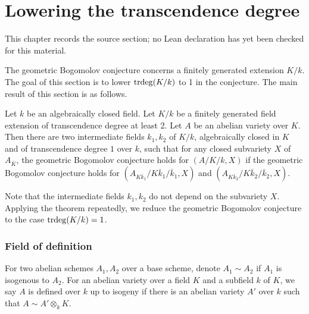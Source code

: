 \chapter{Lowering the transcendence degree}
\label{geometric-bogomolov-conjecture-arbitrary-characteristics-chapter-03}

\begin{remark}
\label{geometric-bogomolov-conjecture-arbitrary-characteristics-chapter-03-source}
This chapter records the source section; no Lean declaration has yet been checked for this material.
\notready
\end{remark}

\label{sec trdeg}

The geometric Bogomolov conjecture concerns a finitely generated extension $K/k$.
The goal of this section is to lower ${\mathrm{trdeg}}(K/k)$ to 1 in the conjecture.
The main result of this section is as follows.

\begin{pro}\label{changefield}
Let $k$ be an algebraically closed field.
Let $K/k$ be a finitely generated field extension of transcendence degree at least 2.
Let $A$ be an abelian variety over $K$.
Then there are two intermediate fields $k_1,k_2$ of $K/k$, algebraically closed in $K$ and of transcendence degree $1$ over $k$, such that for any closed subvariety $X$ of $A_{\overline{K}}$,  the geometric Bogomolov conjecture holds for $(A/K/k, X)$ if the geometric Bogomolov conjecture holds for $(A_{K\overline k_1}/K\overline k_1/\overline k_1,X)$ and $(A_{K\overline k_2}/K\overline k_2/\overline k_2,X)$.
\end{pro}

Note that the intermediate fields $k_1,k_2$ do not depend on the subvariety $X$.
Applying the theorem repeatedly, we reduce the geometric Bogomolov conjecture to the case ${\mathrm{trdeg}}(K/k)=1$.



\subsection{Field of definition}
For two abelian schemes $A_1,A_2$ over a base scheme,  denote $A_1\sim A_2$ if $A_1$ is isogenous to $A_2.$
For an abelian variety over a field $K$ and a subfield $k$ of $K$, we say $A$ is defined over $k$ up to isogeny if there is an abelian variety $A'$ over $k$ such that $A\sim A'\otimes_kK.$


